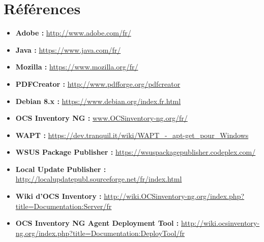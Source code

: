 \documentclass[11pt,a4paper,oneside]{article}
\begin{document}
\section{Références}
\begin{itemize}
\item \textbf{Adobe :} \url {http://www.adobe.com/fr/} 
\item \textbf{Java :} \url {https://www.java.com/fr/}
\item \textbf{Mozilla :} \url {https://www.mozilla.org/fr/}
\item \textbf{PDFCreator :} \url {http://www.pdfforge.org/pdfcreator}
\item \textbf{Debian 8.x :} \url {https://www.debian.org/index.fr.html} 
\item \textbf{OCS Inventory NG :} \url {www.OCSinventory-ng.org/fr/}
\item \textbf{WAPT :} \url {https://dev.tranquil.it/wiki/WAPT_-_apt-get_pour_Windows}
\item \textbf{WSUS Package Publisher :} \url {https://wsuspackagepublisher.codeplex.com/}
\item \textbf{Local Update Publisher :} \url {http://localupdatepubl.sourceforge.net/fr/index.html}
\item \textbf{Wiki d'OCS Inventory :} \url{http://wiki.OCSinventory-ng.org/index.php?title=Documentation:Server/fr}
\item \textbf{OCS Inventory NG Agent Deployment Tool :} \url {http://wiki.ocsinventory-ng.org/index.php?title=Documentation:DeployTool/fr}
\end{itemize}
\end{document}
